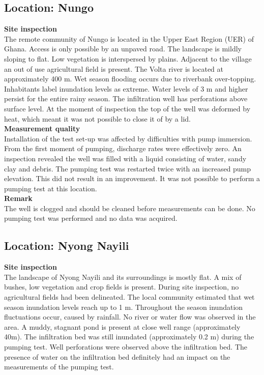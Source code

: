 \subsection{Location: Nungo}

\textbf{Site inspection} \\
The remote community of Nungo is located in the Upper East Region (UER) of Ghana. Access is only possible by an unpaved road. The landscape is mildly sloping to flat. Low vegetation is interspersed by plains. Adjacent to the village an out of use agricultural field is present. The Volta river is located at approximately 400 m. Wet season flooding occurs due to riverbank over-topping. Inhabitants label inundation levels as extreme. Water levels of 3 m and higher persist for the entire rainy season. The infiltration well has perforations above surface level. At the moment of inspection the top of the well was deformed by heat, which meant it was not possible to close it of by a lid. \\
   
\textbf{Measurement quality} \\
Installation of the test set-up was affected by difficulties with pump immersion. From the first moment of pumping, discharge rates were effectively zero. An inspection revealed the well was filled with a liquid consisting of water, sandy clay and debris. The pumping test was restarted twice with an increased pump elevation. This did not result in an improvement. It was not possible to perform a pumping test at this location. \\
  
\textbf{Remark} \\
The well is clogged and should be cleaned before measurements can be done. No pumping test was performed and no data was acquired. 

\subsection{Location: Nyong Nayili}

\textbf{Site inspection} \\
The landscape of Nyong Nayili and its surroundings is mostly flat. A mix of bushes, low vegetation and crop fields is present. During site inspection, no agricultural fields had been delineated. The local community estimated that wet season inundation levels reach up to 1 m. Throughout the season inundation fluctuations occur, caused by rainfall. No river or water flow was observed in the area. A muddy, stagnant pond is present at close well range (approximately 40m). The infiltration bed was still inundated (approximately 0.2 m) during the pumping test. Well perforations were observed above the infiltration bed. The presence of water on the infiltration bed definitely had an impact on the measurements of the pumping test. \\


